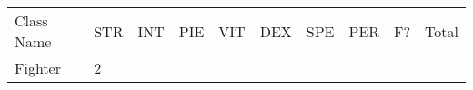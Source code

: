 \documentclass[12pt]{article}
\begin{document}
\begin{longtable}[]{@{}llllllllll@{}}
\toprule
\begin{minipage}[t]{0.13\columnwidth}\raggedright\strut
Class Name
\strut\end{minipage} &
\begin{minipage}[t]{0.06\columnwidth}\raggedright\strut
STR
\strut\end{minipage} &
\begin{minipage}[t]{0.06\columnwidth}\raggedright\strut
INT
\strut\end{minipage} &
\begin{minipage}[t]{0.06\columnwidth}\raggedright\strut
PIE
\strut\end{minipage} &
\begin{minipage}[t]{0.06\columnwidth}\raggedright\strut
VIT
\strut\end{minipage} &
\begin{minipage}[t]{0.06\columnwidth}\raggedright\strut
DEX
\strut\end{minipage} &
\begin{minipage}[t]{0.06\columnwidth}\raggedright\strut
SPE
\strut\end{minipage} &
\begin{minipage}[t]{0.06\columnwidth}\raggedright\strut
PER
\strut\end{minipage} &
\begin{minipage}[t]{0.07\columnwidth}\raggedright\strut
F?
\strut\end{minipage} &
\begin{minipage}[t]{0.08\columnwidth}\raggedright\strut
Total
\strut\end{minipage}\tabularnewline
\begin{minipage}[t]{0.13\columnwidth}\raggedright\strut
Fighter
\strut\end{minipage} &
\begin{minipage}[t]{0.06\columnwidth}\raggedright\strut
2
\strut\end{minipage} &
\begin{minipage}[t]{0.06\columnwidth}\raggedright\strut
\strut\end{minipage} &
\begin{minipage}[t]{0.06\columnwidth}\raggedright\strut
\strut\end{minipage} &
\begin{minipage}[t]{0.06\columnwidth}\raggedright\strut
\strut\end{minipage} &
\begin{minipage}[t]{0.06\columnwidth}\raggedright\strut

\end{minipage}
\end{longtable}
\end{document}
